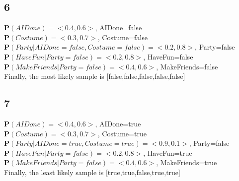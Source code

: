 \documentclass{article}
\begin{document}
        \subsection{6}
            \textbf{P}$(AIDone)=<0.4,0.6>$, AIDone=false
            \\\textbf{P}$(Costume)=<0.3,0.7>$, Costume=false
            \\\textbf{P}$(Party|AIDone=false, Costume=false)=<0.2,0.8>$, Party=false
            \\\textbf{P}$(HaveFun|Party=false)=<0.2,0.8>$, HaveFun=false
            \\\textbf{P}$(MakeFriends|Party=false)=<0.4,0.6>$, MakeFriends=false
            \\Finally, the most likely sample is [false,false,false,false,false]
        \subsection{7}
            \textbf{P}$(AIDone)=<0.4,0.6>$, AIDone=true
            \\\textbf{P}$(Costume)=<0.3,0.7>$, Costume=true
            \\\textbf{P}$(Party|AIDone=true, Costume=true)=<0.9,0.1>$, Party=false
            \\\textbf{P}$(HaveFun|Party=false)=<0.2,0.8>$, HaveFun=true
            \\\textbf{P}$(MakeFriends|Party=false)=<0.4,0.6>$, MakeFriends=true
            \\Finally, the least likely sample is [true,true,false,true,true]
\end{document}
